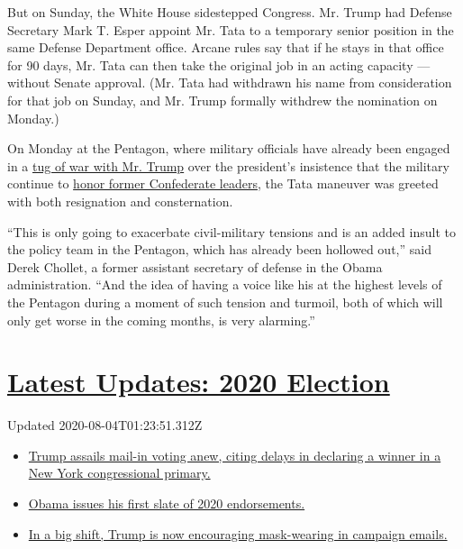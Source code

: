 But on Sunday, the White House sidestepped Congress. Mr. Trump had
Defense Secretary Mark T. Esper appoint Mr. Tata to a temporary senior
position in the same Defense Department office. Arcane rules say that if
he stays in that office for 90 days, Mr. Tata can then take the original
job in an acting capacity --- without Senate approval. (Mr. Tata had
withdrawn his name from consideration for that job on Sunday, and Mr.
Trump formally withdrew the nomination on Monday.)

On Monday at the Pentagon, where military officials have already been
engaged in a
\href{https://www.nytimes.com/2020/07/17/us/politics/pentagon-trump-confederate-symbols.html}{tug
of war with Mr. Trump} over the president's insistence that the military
continue to
\href{https://www.nytimes.com/2020/07/20/us/politics/congress-trump-confederate-base-names.html}{honor
former Confederate leaders}, the Tata maneuver was greeted with both
resignation and consternation.

``This is only going to exacerbate civil-military tensions and is an
added insult to the policy team in the Pentagon, which has already been
hollowed out,'' said Derek Chollet, a former assistant secretary of
defense in the Obama administration. ``And the idea of having a voice
like his at the highest levels of the Pentagon during a moment of such
tension and turmoil, both of which will only get worse in the coming
months, is very alarming.''

\hypertarget{latest-updates-2020-election}{%
\section{\texorpdfstring{\href{https://www.nytimes.com/2020/08/03/us/elections/biden-vs-trump.html?action=click\&pgtype=Article\&state=default\&region=MAIN_CONTENT_1\&context=storylines_live_updates}{Latest
Updates: 2020
Election}}{Latest Updates: 2020 Election}}\label{latest-updates-2020-election}}

Updated 2020-08-04T01:23:51.312Z

\begin{itemize}
\tightlist
\item
  \href{https://www.nytimes.com/2020/08/03/us/elections/biden-vs-trump.html?action=click\&pgtype=Article\&state=default\&region=MAIN_CONTENT_1\&context=storylines_live_updates\#link-6494b448}{Trump
  assails mail-in voting anew, citing delays in declaring a winner in a
  New York congressional primary.}
\item
  \href{https://www.nytimes.com/2020/08/03/us/elections/biden-vs-trump.html?action=click\&pgtype=Article\&state=default\&region=MAIN_CONTENT_1\&context=storylines_live_updates\#link-3de249e6}{Obama
  issues his first slate of 2020 endorsements.}
\item
  \href{https://www.nytimes.com/2020/08/03/us/elections/biden-vs-trump.html?action=click\&pgtype=Article\&state=default\&region=MAIN_CONTENT_1\&context=storylines_live_updates\#link-54e34d20}{In
  a big shift, Trump is now encouraging mask-wearing in campaign
  emails.}
\end{itemize}


